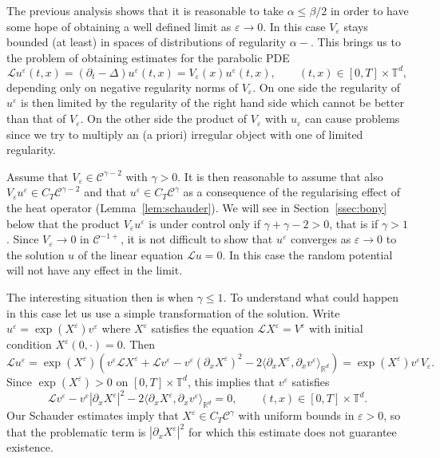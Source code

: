 \documentclass[a4paper,11pt]{article}
\newcommand{\LL}{\mathscr{L}}
\newcommand{\CC}{\mathscr{C}}
\begin{document}
The previous analysis shows that it is reasonable to take $\alpha \leqslant
\beta / 2$ in order to have some hope of obtaining a well defined limit as
$\varepsilon \rightarrow 0$. In this case $V_{\varepsilon}$ stays bounded (at
least) in spaces of distributions of regularity $\alpha -$. This brings us to
the problem of obtaining estimates for the parabolic PDE
\[ \LL u^{\varepsilon} (t, x) = (\partial_t - \Delta) u^{\varepsilon} (t, x) =
   V_{\varepsilon} (x) u^{\varepsilon} (t, x), \hspace{2em} (t, x) \in [0, T]
   \times \mathbb{T}^d, \]
depending only on negative regularity norms of $V_{\varepsilon}$. On one side
the regularity of $u^{\varepsilon}$ is then limited by the regularity of the
right hand side which cannot be better than that of $V_{\varepsilon}$. On the
other side the product of $V_{\varepsilon}$ with $u_{\varepsilon}$ can cause
problems since we try to multiply an (a priori) irregular object with one of
limited regularity.

Assume that $V_{\varepsilon} \in \CC^{\gamma - 2}$ with $\gamma > 0$. It is
then reasonable to assume that also $V_{\varepsilon} u^{\varepsilon} \in C_T
\CC^{\gamma - 2}$ and that $u^{\varepsilon} \in C_T \CC^{\gamma}$ as a
consequence of the regularising effect of the heat operator
(Lemma~\ref{lem:schauder}). We will see in Section~\ref{ssec:bony} below that
the product $V_{\varepsilon} u^{\varepsilon}$ is under control only if $\gamma
+ \gamma - 2 > 0$, that is if $\gamma > 1$. Since $V_{\varepsilon} \rightarrow
0$ in $\CC^{- 1 +}$, it is not difficult to show that $u^{\varepsilon}$
converges as $\varepsilon \rightarrow 0$ to the solution $u$ of the linear
equation $\LL u = 0$. In this case the random potential will not have any
effect in the limit.

The interesting situation then is when $\gamma \leqslant 1$. To understand
what could happen in this case let us use a simple transformation of the
solution. Write $u^{\varepsilon} = \exp (X^{\varepsilon}) v^{\varepsilon}$
where $X^{\varepsilon}$ satisfies the equation $\LL X^{\varepsilon} =
V^{\varepsilon}$ with initial condition $X^{\varepsilon} (0, \cdot) = 0$. Then
\[ \LL u^{\varepsilon} = \exp (X^{\varepsilon}) \left( v^{\varepsilon} \LL
   X^{\varepsilon} + \LL v^{\varepsilon} - v^{\varepsilon} (\partial_x
   X^{\varepsilon})^2 - 2 \langle \partial_x X^{\varepsilon}, \partial_x
   v^{\varepsilon} \rangle_{\mathbb{R}^d} \right) = \exp (X^{\varepsilon})
   v^{\varepsilon} V_{\varepsilon} . \]
Since $\exp (X^{\varepsilon}) > 0$ on $[0, T] \times \mathbb{T}^d$, this
implies that $v^{\varepsilon}$ satisfies
\[ \LL v^{\varepsilon} - v^{\varepsilon} | \partial_x X^{\varepsilon} |^2 - 2
   \langle \partial_x X^{\varepsilon}, \partial_x v^{\varepsilon}
   \rangle_{\mathbb{R}^d} = 0, \hspace{2em} (t, x) \in [0, T] \times
   \mathbb{T}^d . \]
Our Schauder estimates imply that $X^{\varepsilon} \in C_T \CC^{\gamma}$ with
uniform bounds in $\varepsilon > 0$, so that the problematic term is $|
\partial_x X^{\varepsilon} |^2$ for which this estimate does not guarantee
existence.
\end{document}
